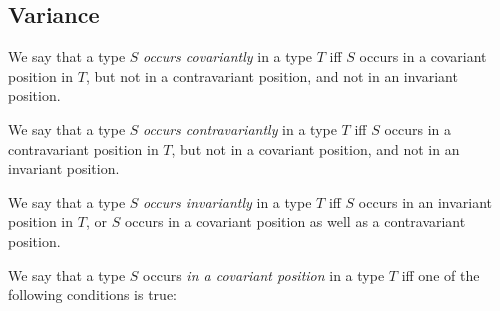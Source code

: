 \documentclass{article}
\begin{document}










\subsection{Variance}

\LMHash{}
We say that a type $S$ {\em occurs covariantly} in a type $T$ if{}f
$S$ occurs in a covariant position in $T$,
but not in a contravariant position,
and not in an invariant position.

\LMHash{}
We say that a type $S$ {\em occurs contravariantly} in a type $T$ if{}f
$S$ occurs in a contravariant position in $T$,
but not in a covariant position,
and not in an invariant position.

\LMHash{}
We say that a type $S$ {\em occurs invariantly} in a type $T$ if{}f
$S$ occurs in an invariant position in $T$,
or $S$ occurs in a covariant position as well as a contravariant position.

\LMHash{}
We say that a type $S$ occurs {\em in a covariant position} in a type $T$
if{}f one of the following conditions is true:
\end{document}
